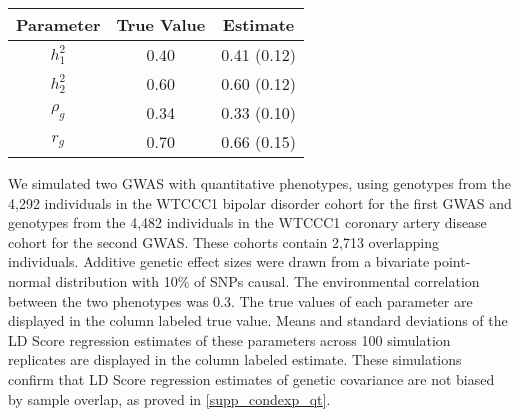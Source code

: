 
\begin{table}[ht]\centering
\begin{tabular}{c | cc}
  \hline
Parameter & True Value & Estimate\\
 \hline
$h^2_1$ & 0.40 & 0.41 (0.12) \\ 
$h^2_2$ & 0.60 & 0.60 (0.12) \\ 
$\rho_g$ & 0.34 & 0.33 (0.10) \\ 
$r_g$      & 0.70 & 0.66 (0.15) \\ 
   \hline
\end{tabular}
\end{table}

We simulated two GWAS with quantitative phenotypes,
using genotypes from the 4,292 individuals in the WTCCC1 bipolar disorder cohort for the first GWAS
and genotypes from the 4,482 individuals in the WTCCC1 coronary artery disease cohort for the second GWAS.
These cohorts contain 2,713 overlapping individuals. 
Additive genetic effect sizes were drawn from a bivariate point-normal distribution 
with 10\% of SNPs causal. 
The environmental correlation between the two phenotypes was 0.3. 
The true values of each parameter are displayed in the column labeled true value.
Means and standard deviations of the LD Score regression estimates of these parameters across 100 simulation replicates
are displayed in the column labeled estimate.
These simulations confirm that LD Score regression estimates of genetic covariance are not biased by sample overlap,
as proved in \ref{supp_condexp_qt}.
